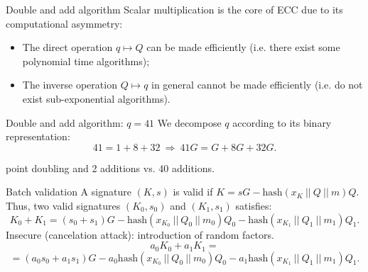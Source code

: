 \documentclass[slidescentered]{beamer}
\begin{document}
	\begin{frame}[label = double_add]{Double and add algorithm}
		Scalar multiplication is the core of ECC due to its computational asymmetry:
		\begin{itemize}
			\item The direct operation $q \mapsto Q$ can be made efficiently (i.e. there exist some polynomial time algorithms);
			\item The inverse operation $Q \mapsto q$ in general cannot be made efficiently (i.e. do not exist sub-exponential algorithms).
		\end{itemize}
	
		\bigskip
		\noindent
			
		\begin{block}{Double and add algorithm: $q = 41$}
			We decompose $q$ according to its binary representation:
			$$41 = 1 + 8 + 32  \ \Longrightarrow \ 41G = G + 8G + 32G.$$
			
			 point doubling and 2 additions vs. 40 additions.
	\end{block}
	\end{frame}

	\begin{frame}[label = batch_validation]{Batch validation}
		A signature $(K, s)$ is valid if $K = sG - \text{hash}(x_K \ || \ Q \ || \ m)Q$. Thus, two valid signatures $(K_0, s_0)$ and $(K_1, s_1)$ satisfies:
		$$K_0 + K_1 = (s_0 + s_1)G - \text{hash}(x_{K_0} \ || \ Q_0 \ || \ m_0)Q_0 - \text{hash}(x_{K_1} \ || \ Q_1 \ || \ m_1)Q_1.$$
		Insecure (cancelation attack): introduction of random factors.
		$$a_0K_0 + a_1K_1 =$$ $$
		= (a_0s_0 + a_1s_1)G - a_0\text{hash}(x_{K_0} \ || \ Q_0 \ || \ m_0)Q_0 - a_1\text{hash}(x_{K_1} \ || \ Q_1 \ || \ m_1)Q_1.$$
	\end{frame}
\end{document}
